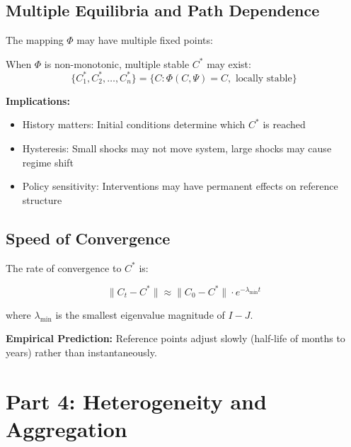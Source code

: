 \subsection{Multiple Equilibria and Path Dependence}

The mapping $\Phi$ may have multiple fixed points:

\begin{tcolorbox}[colback=yellow!5!white, colframe=yellow!75!black,
    title=Result AZ-D2: Multiplicity of $C^*$]
When $\Phi$ is non-monotonic, multiple stable $C^*$ may exist:
\begin{equation}
\{C^*_1, C^*_2, \ldots, C^*_n\} = \{C : \Phi(C, \Psi) = C, \text{ locally stable}\}
\end{equation}

\textbf{Implications:}
\begin{itemize}[nosep]
\item History matters: Initial conditions determine which $C^*$ is reached
\item Hysteresis: Small shocks may not move system, large shocks may cause regime shift
\item Policy sensitivity: Interventions may have permanent effects on reference structure
\end{itemize}
\end{tcolorbox}

\subsection{Speed of Convergence}

The rate of convergence to $C^*$ is:

\begin{equation}
\|C_t - C^*\| \approx \|C_0 - C^*\| \cdot e^{-\lambda_{\min} t}
\end{equation}

where $\lambda_{\min}$ is the smallest eigenvalue magnitude of $I - J$.

\textbf{Empirical Prediction:} Reference points adjust slowly (half-life of months
to years) rather than instantaneously.


\section{Part 4: Heterogeneity and Aggregation}
\label{sec:az-heterogeneity}

